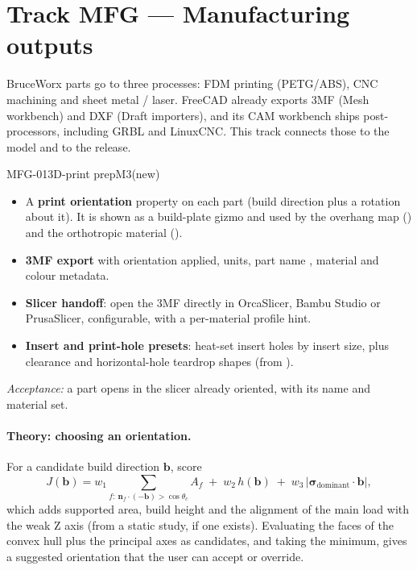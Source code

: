 \section{Track MFG --- Manufacturing outputs}\label{sec:mfg}

BruceWorx parts go to three processes: FDM printing (PETG/ABS), CNC machining and sheet metal / laser.
FreeCAD already exports 3MF (Mesh workbench) and DXF (Draft importers), and its CAM workbench ships
post-processors, including GRBL and LinuxCNC. This track connects those to the model and to the release.

\begin{epic}{MFG-01}{3D-print prep}{M3}{\stTodo}{(new)}
\begin{itemize}
  \item A \textbf{print orientation} property on each part (build direction plus a rotation about it). It is
        shown as a build-plate gizmo and used by the overhang map () and the orthotropic
        material ().
  \item \textbf{3MF export} with orientation applied, units, part name , material and colour
        metadata.
  \item \textbf{Slicer handoff}: open the 3MF directly in OrcaSlicer, Bambu Studio or PrusaSlicer, configurable,
        with a per-material profile hint.
  \item \textbf{Insert and print-hole presets}: heat-set insert holes by insert size, plus clearance and
        horizontal-hole teardrop shapes (from ).
\end{itemize}
\emph{Acceptance:} a part opens in the slicer already oriented, with its name and material set.
\end{epic}

\paragraph{Theory: choosing an orientation.} For a candidate build direction $\mathbf b$, score
\[
  J(\mathbf b)=w_1\!\!\sum_{f:\ \mathbf n_f\cdot(-\mathbf b)>\cos\theta_c}\!\! A_f
  \;+\;w_2\,h(\mathbf b)\;+\;w_3\,\big|\boldsymbol\sigma_{\text{dominant}}\cdot\mathbf b\big| ,
\]
which adds supported area, build height and the alignment of the main load with the weak Z axis (from a
static study, if one exists). Evaluating the faces of the convex hull plus the principal axes as candidates,
and taking the minimum, gives a suggested orientation that the user can accept or override.

